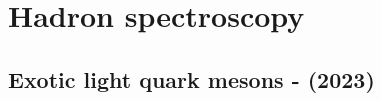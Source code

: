 \documentclass{article}
\begin{document}
\section{Hadron spectroscopy}\label{sec:hadspec}






\subsection{Exotic light quark mesons - (2023) }
\end{document}
